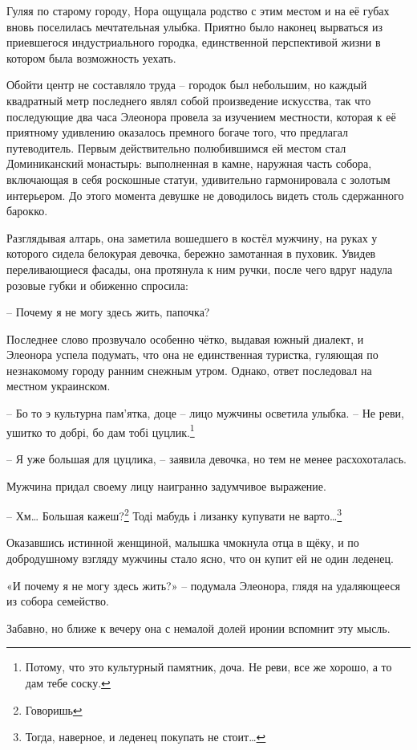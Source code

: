 \documentclass[
  a5paperpaper,
  DIV=11,
  numbers=noendperiod]{scrreprt}
\begin{document}
Гуляя по старому городу, Нора ощущала родство с этим местом и на её
губах вновь поселилась мечтательная улыбка. Приятно было наконец
вырваться из приевшегося индустриального городка, единственной
перспективой жизни в котором была возможность уехать.

Обойти центр не составляло труда -- городок был небольшим, но каждый
квадратный метр последнего являл собой произведение искусства, так что
последующие два часа Элеонора провела за изучением местности, которая к
её приятному удивлению оказалось премного богаче того, что предлагал
путеводитель. Первым действительно полюбившимся ей местом стал
Доминиканский монастырь: выполненная в камне, наружная часть собора,
включающая в себя роскошные статуи, удивительно гармонировала с золотым
интерьером. До этого момента девушке не доводилось видеть столь
сдержанного барокко.

Разглядывая алтарь, она заметила вошедшего в костёл мужчину, на руках у
которого сидела белокурая девочка, бережно замотанная в пуховик. Увидев
переливающиеся фасады, она протянула к ним ручки, после чего вдруг
надула розовые губки и обиженно спросила:

-- Почему я не могу здесь жить, папочка?

Последнее слово прозвучало особенно чётко, выдавая южный диалект, и
Элеонора успела подумать, что она не единственная туристка, гуляющая по
незнакомому городу ранним снежным утром. Однако, ответ последовал на
местном украинском.

-- Бо то э культурна пам'ятка, доце -- лицо мужчины осветила улыбка. --
Не реви, ушитко то добрі, бо дам тобі цуцлик.\footnote{Потому, что это
  культурный памятник, доча. Не реви, все же хорошо, а то дам тебе
  соску.}

-- Я уже большая для цуцлика, -- заявила девочка, но тем не менее
расхохоталась.

Мужчина придал своему лицу наигранно задумчивое выражение.

-- Хм\ldots{} Большая кажеш?\footnote{Говоришь} Тоді мабудь і лизанку
купувати не варто\ldots{}\footnote{Тогда, наверное, и леденец покупать
  не стоит\ldots{}}

Оказавшись истинной женщиной, малышка чмокнула отца в щёку, и по
добродушному взгляду мужчины стало ясно, что он купит ей не один
леденец.

«И почему я не могу здесь жить?» -- подумала Элеонора, глядя на
удаляющееся из собора семейство.

Забавно, но ближе к вечеру она с немалой долей иронии вспомнит эту
мысль.
\end{document}
